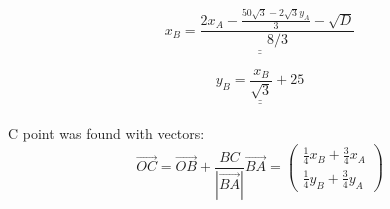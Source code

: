 \documentclass[a4paper,11pt,oneside,article]{memoir}
\def\doubleunderline#1{\underline{\underline{#1}}}
\begin{document}
    \begin{equation*}
    \doubleunderline{
        x_B= \frac{2x_A - \frac{50\sqrt{3}-2\sqrt{3}y_A}{3} - \sqrt{D}}{8/3}
        }
    \end{equation*}

    \begin{equation*}
    \doubleunderline{
        y_B= \frac{x_B}{\sqrt{3}}+25
        }
    \end{equation*}
\\
C point was found with vectors:
\begin{equation*}
    \overrightarrow{OC} = \overrightarrow{OB}+\frac{BC}{|\overrightarrow{BA}|}\overrightarrow{BA} = \begin{pmatrix}
            \frac{1}{4}x_B + \frac{3}{4}x_A
            \\
            \frac{1}{4}y_B + \frac{3}{4}y_A
    \end{pmatrix}
\end{equation*}\\
\end{document}

